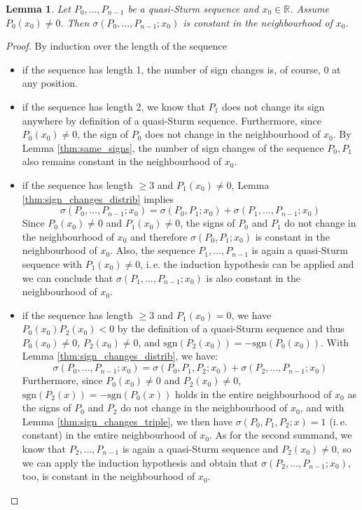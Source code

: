 \documentclass[11pt,a4paper,oneside]{article}
\newtheorem{lemma}[definition]{Lemma}
\newcommand{\RR}{\mathbb{R}}
\newcommand{\sgn}{\mathrm{sgn}}
\newcommand{\ie}{i.\,e.\xspace}
\begin{document}
\begin{lemma}\label{thm:nonzero}
Let $P_0,\ldots,P_{n-1}$ be a quasi-Sturm sequence and $x_0\in\RR$. Assume $P_0(x_0)\neq 0$. Then $\sigma(P_0,\ldots,P_{n-1}; x_0)$ is constant in the neighbourhood of $x_0$.
\end{lemma}
\begin{proof}
By induction over the length of the sequence
\begin{itemize}
\item if the sequence has length 1, the number of sign changes is, of course, $0$ at any position.
\item if the sequence has length 2, we know that $P_1$ does not change its sign anywhere by definition of a quasi-Sturm sequence. Furthermore, since $P_0(x_0)\neq 0$, the sign of $P_0$ does not change in the neighbourhood of $x_0$. By Lemma \ref{thm:same_signs}, the number of sign changes of the sequence $P_0,P_1$ also remains constant in the neighbourhood of $x_0$.
\item if the sequence has length $\geq 3$ and $P_1(x_0)\neq 0$, Lemma \ref{thm:sign_changes_distrib} implies $$\sigma(P_0,\ldots,P_{n-1}; x_0)=\sigma(P_0,P_1;x_0)+\sigma(P_1,\ldots,P_{n-1};x_0)$$ Since $P_0(x_0)\neq 0$ and $P_1(x_0)\neq 0$, the signs of $P_0$ and $P_1$ do not change in the neighbourhood of $x_0$ and therefore $\sigma(P_0, P_1;x_0)$ is constant in the neighbourhood of $x_0$. Also, the sequence $P_1,\ldots,P_{n-1}$ is again a quasi-Sturm sequence with $P_1(x_0)\neq 0$, \ie the induction hypothesis can be applied and we can conclude that $\sigma(P_1,\ldots,P_{n-1};x_0)$ is also constant in the neighbourhood of $x_0$.
\item if the sequence has length $\geq 3$ and $P_1(x_0)=0$, we have $P_0(x_0)P_2(x_0)<0$ by the definition of a quasi-Sturm sequence and thus $P_0(x_0)\neq 0$, $P_2(x_0)\neq 0$, and $\sgn(P_2(x_0))=-\sgn(P_0(x_0))$. With Lemma \ref{thm:sign_changes_distrib}, we have: $$\sigma(P_0,\ldots,P_{n-1}; x_0) = \sigma(P_0,P_1,P_2;x_0) + \sigma(P_2,\ldots,P_{n-1}; x_0)$$ Furthermore, since $P_0(x_0)\neq 0$ and $P_2(x_0)\neq 0$, $\sgn(P_2(x))=-\sgn(P_0(x))$ holds in the entire neighbourhood of $x_0$ as the signs of $P_0$ and $P_2$ do not change in the neighbourhood of $x_0$, and with Lemma \ref{thm:sign_changes_triple}, we then have $\sigma(P_0,P_1,P_2;x)=1$ (\ie constant) in the entire neighbourhood of $x_0$. As for the second summand, we know that $P_2,\ldots,P_{n-1}$ is again a quasi-Sturm sequence and $P_2(x_0)\neq 0$, so we can apply the induction hypothesis and obtain that $\sigma(P_2,\ldots,P_{n-1};x_0)$, too, is constant in the neighbourhood of $x_0$.
\end{itemize}
\end{proof}
\end{document}

